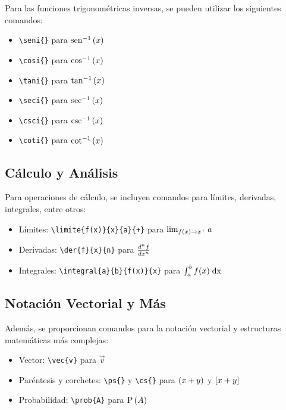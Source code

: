 \documentclass[11pt]{article}
\begin{document}
Para las funciones trigonométricas inversas, se pueden utilizar los siguientes comandos:

\begin{itemize}
    \item \texttt{\textbackslash seni\{\}} para $\seni{x}$
    \item \texttt{\textbackslash cosi\{\}} para $\cosi{x}$
    \item \texttt{\textbackslash tani\{\}} para $\tani{x}$
    \item \texttt{\textbackslash seci\{\}} para $\seci{x}$
    \item \texttt{\textbackslash csci\{\}} para $\csci{x}$
    \item \texttt{\textbackslash coti\{\}} para $\coti{x}$
\end{itemize}

\subsection{Cálculo y Análisis}

Para operaciones de cálculo, se incluyen comandos para límites, derivadas, integrales, entre otros:

\begin{itemize}
    \item Límites: \texttt{\textbackslash limite\{f(x)\}\{x\}\{a\}\{+\}} para $\limite{f(x)}{x}{a}{+}$
    \item Derivadas: \texttt{\textbackslash der\{f\}\{x\}\{n\}} para $\der{f}{x}{n}$
    \item Integrales: \texttt{\textbackslash integral\{a\}\{b\}\{f(x)\}\{x\}} para $\integral{a}{b}{f(x)}{x}$
\end{itemize}

\subsection{Notación Vectorial y Más}

Además, se proporcionan comandos para la notación vectorial y estructuras matemáticas más complejas:

\begin{itemize}
    \item Vector: \texttt{\textbackslash vec\{v\}} para $\vec{v}$
    \item Paréntesis y corchetes: \texttt{\textbackslash ps\{\}} y \texttt{\textbackslash cs\{\}} para $\ps{x+y}$ y $\cs{x+y}$
    \item Probabilidad: \texttt{\textbackslash prob\{A\}} para $\prob{A}$
\end{itemize}
\end{document}
